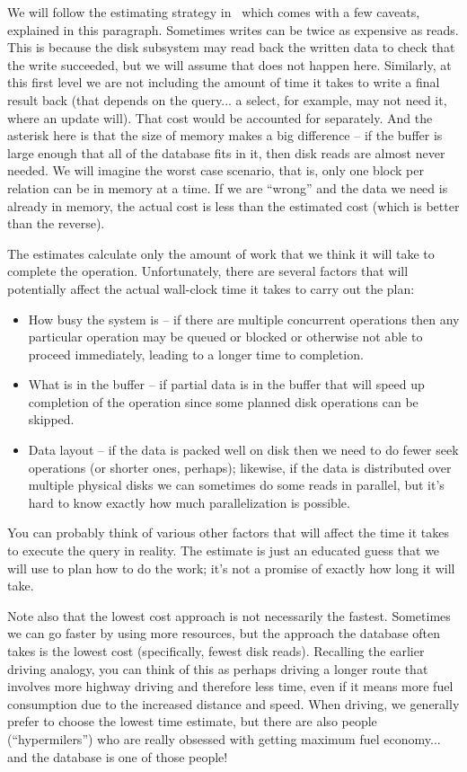 We will follow the estimating strategy in~\cite{dsc} which comes with a few caveats, explained in this paragraph. Sometimes writes can be twice as expensive as reads. This is because the disk subsystem may read back the written data to check that the write succeeded, but we will assume that does not happen here. Similarly, at this first level we are not including the amount of time it takes to write a final result back (that depends on the query... a select, for example, may not need it, where an update will). That cost would be accounted for separately. And the asterisk here is that the size of memory makes a big difference -- if the buffer is large enough that all of the database fits in it, then disk reads are almost never needed. We will imagine the worst case scenario, that is, only one block per relation can be in memory at a time. If we are ``wrong'' and the data we need is already in memory, the actual cost is less than the estimated cost (which is better than the reverse). 

The estimates calculate only the amount of work that we think it will take to complete the operation. Unfortunately, there are several factors that will potentially affect the actual wall-clock time it takes to carry out the plan:

\begin{itemize}
	\item How busy the system is -- if there are multiple concurrent operations then any particular operation may be queued or blocked or otherwise not able to proceed immediately, leading to a longer time to completion.
	\item What is in the buffer -- if partial data is in the buffer that will speed up completion of the operation since some planned disk operations can be skipped.
	\item Data layout -- if the data is packed well on disk then we need to do fewer seek operations (or shorter ones, perhaps); likewise, if the data is distributed over multiple physical disks we can sometimes do some reads in parallel, but it's hard to know exactly how much parallelization is possible.
\end{itemize}

You can probably think of various other factors that will affect the time it takes to execute the query in reality. The estimate is just an educated guess that we will use to plan how to do the work; it's not a promise of exactly how long it will take.

Note also that the lowest cost approach is not necessarily the fastest. Sometimes we can go faster by using more resources, but the approach the database often takes is the lowest cost (specifically, fewest disk reads). Recalling the earlier driving analogy, you can think of this as perhaps driving a longer route that involves more highway driving and therefore less time, even if it means more fuel consumption due to the increased distance and speed. When driving, we generally prefer to choose the lowest time estimate, but there are also people (``hypermilers'') who are really obsessed with getting maximum fuel economy... and the database is one of those people!

